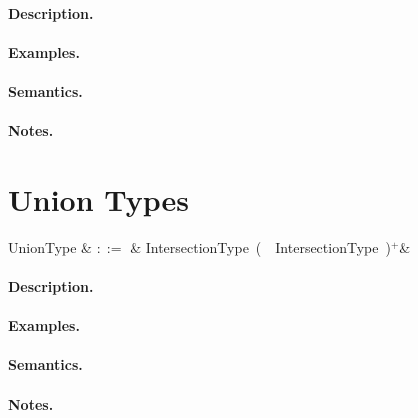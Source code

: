\paragraph{Description.}

\paragraph{Examples.}

\paragraph{Semantics.}

\paragraph{Notes.} 


\section{Union Types}

\begin{syntax}
  UnionType & $::=$ & IntersectionType\ \big(\ \token{|}\ IntersectionType\
  \big)$^+$&\\
\end{syntax}

\paragraph{Description.}

\paragraph{Examples.}

\paragraph{Semantics.}

\paragraph{Notes.}


